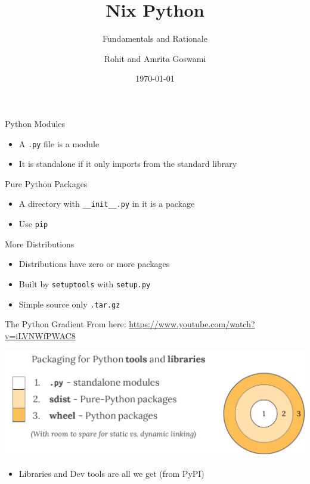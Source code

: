 \documentclass[bigger,unknownkeysallowed,aspectratio=169,colorblocks]{beamer}
\author{Rohit and Amrita Goswami}
\date{\today}
\title{Nix Python}
\subtitle{Fundamentals and Rationale}
\institute{Presented at \textbf{CarpentryCon 2020}}
\begin{document}
\maketitle

\begin{frame}[label={sec:org12a81ce},fragile]{Python Modules}
 \begin{itemize}
\item A \texttt{.py} file is a \alert{module}
\item It is \alert{standalone} if it only imports from the standard library
\end{itemize}
\end{frame}
\begin{frame}[label={sec:orgb8270dd},fragile]{Pure Python Packages}
 \begin{itemize}
\item A directory with \texttt{\_\_init\_\_.py} in it is a \alert{package}
\item Use \texttt{pip}
\end{itemize}
\end{frame}
\begin{frame}[label={sec:org82c0bf9},fragile]{More Distributions}
 \begin{itemize}
\item Distributions have zero or more packages
\item Built by \texttt{setuptools} with \texttt{setup.py}
\item Simple source only \texttt{.tar.gz}
\end{itemize}
\end{frame}
\begin{frame}[label={sec:org0ee7dea}]{The Python Gradient}
From here: \url{https://www.youtube.com/watch?v=iLVNWfPWAC8}

\begin{center}
\includegraphics[width=.9\linewidth]{images/The_Python_Gradient/2020-05-22_23-00-30_screenshot.png}
\end{center}
\begin{itemize}
\item Libraries and Dev tools are all we get (from PyPI)
\end{itemize}
\end{frame}
\end{document}
